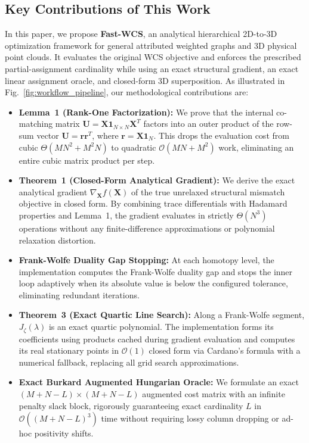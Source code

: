\documentclass[conference]{IEEEtran}
\begin{document}
\subsection{Key Contributions of This Work}

In this paper, we propose \textbf{Fast-WCS}, an analytical hierarchical 2D-to-3D optimization framework for general attributed weighted graphs and 3D physical point clouds. It evaluates the original WCS objective and enforces the prescribed partial-assignment cardinality while using an exact structural gradient, an exact linear assignment oracle, and closed-form 3D superposition. As illustrated in Fig.~\ref{fig:workflow_pipeline}, our methodological contributions are:

\begin{itemize}
    \item \textbf{Lemma~1 (Rank-One Factorization):} We prove that the internal co-matching matrix $\mathbf{U} = \mathbf{X}\mathbf{1}_{N\times N}\mathbf{X}^T$ factors into an outer product of the row-sum vector $\mathbf{U} = \mathbf{r}\mathbf{r}^T$, where $\mathbf{r} = \mathbf{X}\mathbf{1}_N$. This drops the evaluation cost from cubic $\Theta(MN^2 + M^2N)$ to quadratic $\mathcal{O}(MN + M^2)$ work, eliminating an entire cubic matrix product per step.
    \item \textbf{Theorem~1 (Closed-Form Analytical Gradient):} We derive the exact analytical gradient $\nabla_{\mathbf{X}} f(\mathbf{X})$ of the true unrelaxed structural mismatch objective in closed form. By combining trace differentials with Hadamard properties and Lemma~1, the gradient evaluates in strictly $\Theta(N^3)$ operations without any finite-difference approximations or polynomial relaxation distortion.
    \item \textbf{Frank-Wolfe Duality Gap Stopping:} At each homotopy level, the implementation computes the Frank-Wolfe duality gap and stops the inner loop adaptively when its absolute value is below the configured tolerance, eliminating redundant iterations.
    \item \textbf{Theorem~3 (Exact Quartic Line Search):} Along a Frank-Wolfe segment, $J_\zeta(\lambda)$ is an exact quartic polynomial. The implementation forms its coefficients using products cached during gradient evaluation and computes its real stationary points in $\mathcal{O}(1)$ closed form via Cardano's formula with a numerical fallback, replacing all grid search approximations.
    \item \textbf{Exact Burkard Augmented Hungarian Oracle:} We formulate an exact $(M+N-L) \times (M+N-L)$ augmented cost matrix with an infinite penalty slack block, rigorously guaranteeing exact cardinality $L$ in $\mathcal{O}((M+N-L)^3)$ time without requiring lossy column dropping or ad-hoc positivity shifts.

\end{itemize}
\end{document}
